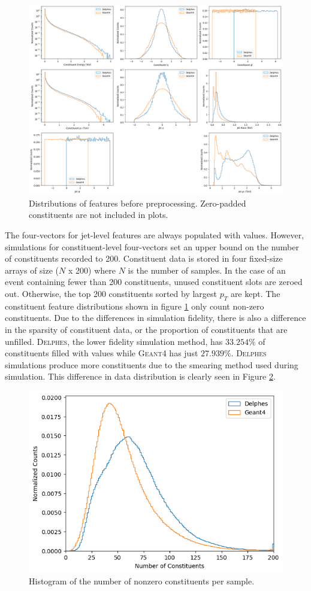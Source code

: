 \begin{figure}
    \centering
    \includegraphics[width=1\linewidth]{figures/feature_hists.png}
    \caption{Distributions of features before preprocessing. Zero-padded constituents are not included in plots.}
    \label{fig:feature_hists}
\end{figure}

The four-vectors for jet-level features are always populated with values. However, simulations for constituent-level four-vectors set an upper bound on the number of constituents recorded to 200. Constituent data is stored in four fixed-size arrays of size ($N$ x 200) where $N$ is the number of samples. In the case of an event containing fewer than 200 constituents, unused constituent slots are zeroed out. Otherwise, the top 200 constituents sorted by largest $p_T$ are kept. The constituent feature distributions shown in figure \ref{fig:feature_hists} only count non-zero constituents. Due to the differences in simulation fidelity, there is also a difference in the sparsity of constituent data, or the proportion of constituents that are unfilled. \textsc{Delphes}, the lower fidelity simulation method, has $33.254\%$ of constituents filled with values while \textsc{Geant4} has just $27.939\%$. \textsc{Delphes} simulations produce more constituents due to the smearing method used during simulation. This difference in data distribution is clearly seen in Figure \ref{fig:num_constituents_hist}.

\begin{figure}
    \centering
    \includegraphics[width=0.5\linewidth]{figures/num_constituents_hist.png}
    \caption{Histogram of the number of nonzero constituents per sample.}
    \label{fig:num_constituents_hist}
\end{figure}

